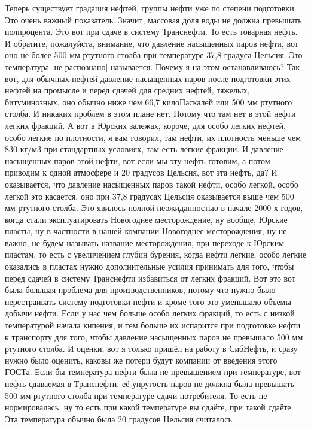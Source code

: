 \documentclass[main.tex]{subfiles}
\begin{document}
Теперь существует градация нефтей, группы нефти уже по степени подготовки.
Это очень важный показатель.
Значит, массовая доля воды не должна превышать полпроцента.
Это вот при сдаче в систему Транснефти.
То есть товарная нефть.
И обратите, пожалуйста, внимание, что давление насыщенных паров нефти, вот оно не более 500 мм ртутного столба при температуре 37,8 градуса Цельсия.
Это температура [не распознано] называется.
Почему я на этом останавливаюсь?
Так вот, для обычных нефтей давление насыщенных паров после подготовки этих нефтей на промысле и перед сдачей для средних нефтей, тяжелых, битуминозных, оно обычно ниже чем 66,7 килоПаскалей или 500 мм ртутного столба.
И никаких проблем в этом плане нет.
Потому что там нет в этой нефти легких фракций.
А вот в Юрских залежах, короче, для особо легких нефтей, особо легкие по плотности, я вам говорил, там нефти, их плотность меньше чем 830 кг/м3 при стандартных условиях, там есть легкие фракции.
И давление насыщенных паров этой нефти, вот если мы эту нефть готовим,
а потом приводим к одной атмосфере и 20 градусов Цельсия, вот эта нефть, да?
И оказывается, что давление насыщенных паров такой нефти, особо легкой, особо легкой это касается, оно при 37,8 градусах Цельсия оказывается выше чем 500 мм ртутного столба.
Это явилось полной неожиданностью в начале 2000-х годов, когда стали эксплуатировать Новогоднее месторождение, ну вообще, Юрские пласты, ну в частности в нашей компании Новогоднее месторождения, ну не важно, не будем называть название месторождения, при переходе к Юрским пластам, то есть с увеличением глубин бурения, когда нефти легкие, особо легкие оказались в пластах нужно дополнительные усилия принимать для того, чтобы перед сдачей в систему Транснефти избавиться от легких фракций.
Вот это вот была большая проблема для производственников, потому что нужно было перестраивать систему подготовки нефти и кроме того это уменьшало объемы добычи нефти.
Если у нас чем больше особо легких фракций, то есть с низкой температурой начала кипения, и тем больше их испарится при подготовке нефти к транспорту для того, чтобы давление насыщенных паров не превышало 500 мм ртутного столба.
И оценки, вот я только пришёл на работу в СибНефть, и сразу нужно было оценить, каковы же потери будут компании от введения этого ГОСТа.
Если бы температура нефти была не превышением при температуре, вот нефть сдаваемая в Транснефти, её упругость паров не должна была превышать 500 мм ртутного столба при температуре сдачи потребителя.
То есть не нормировалась, ну то есть при какой температуре вы сдаёте, при такой сдаёте.
Эта температура обычно была 20 градусов Цельсия считалось.
\end{document}
